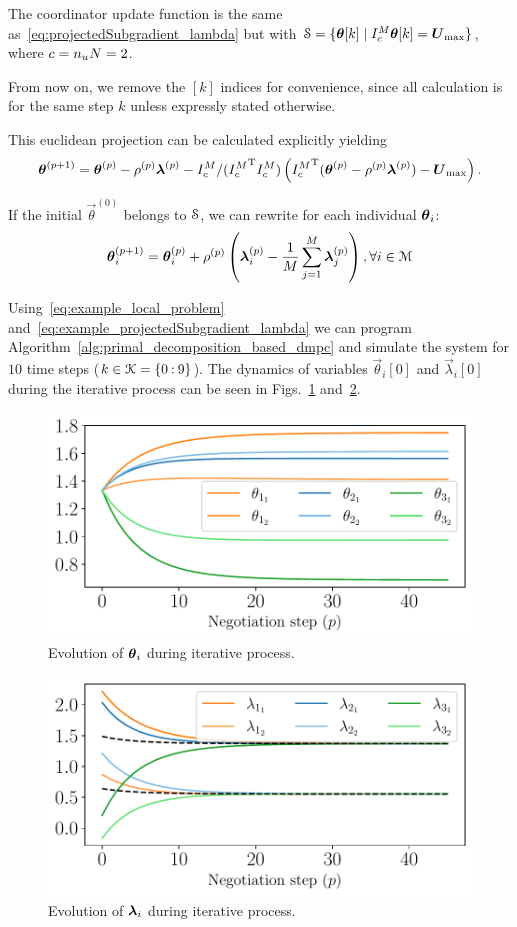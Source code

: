 \documentclass[../main.tex]{subfiles}
\begin{document}
The coordinator update function is the same as~\eqref{eq:projectedSubgradient_lambda} but with ${\mathcal{S} = \{\boldsymbol{\theta}[k]\mid I_{c}^{M}\boldsymbol{\theta}[k] = \boldsymbol{U}_{\max}\}}$, where $c=n_{u}N=2$.

From now on, we remove the $[k]$ indices for convenience, since all calculation is for the same step $k$ unless expressly stated otherwise.

This euclidean projection can be calculated explicitly yielding
\begin{equation}
    \boldsymbol{\theta}^{(p+1)}=\boldsymbol{\theta}^{(p)}-\rho^{(p)}\boldsymbol{\lambda}^{(p)}-{I_{c}^M}/({I_{c}^M}^{\mathrm{T}} {I_{c}^M})\left({I_{c}^M}^{\mathrm{T}}(\boldsymbol{\theta}^{(p)}-\rho^{(p)}\boldsymbol{\lambda}^{(p)}) -\boldsymbol{U}_{\max}\right).
\end{equation}

If the initial ${\vec{\theta}}^{(0)}$ belongs to $\mathcal{S}$, we can rewrite for each individual $\boldsymbol{\theta}_i$:
\begin{equation}
  \label{eq:example_projectedSubgradient_lambda}
 \boldsymbol{\theta}_i^{(p+1)}=\boldsymbol{\theta}_i^{(p)}+\rho^{(p)}\left(\boldsymbol{\lambda}_i^{(p)}-\frac{1}{M}\sum_{j=1}^{M}\boldsymbol{\lambda}_j^{(p)}\right),\forall i\in\mathcal{M}
\end{equation}

Using~\eqref{eq:example_local_problem} and~\eqref{eq:example_projectedSubgradient_lambda}
we can program Algorithm~\ref{alg:primal_decomposition_based_dmpc} and simulate the system for $10$ time steps (${k\in\mathcal{K}=\{0\mathbin{:}9\}}$).
The dynamics of variables $\vec{\theta}_{i}[0]$ and $\vec{\lambda}_{i}[0]$ during the iterative process can be seen in Figs.~\ref{fig:example_theta} and~\ref{fig:example_lambda}.

\begin{figure}[h]
  \centering
  \includegraphics[width=.5\textwidth]{../img/example_theta.pdf}
  \caption{Evolution of $\boldsymbol{\theta}_i$ during iterative process. }\label{fig:example_theta}
\end{figure}

\begin{figure}[h]
  \centering
  \includegraphics[width=.5\textwidth]{../img/example_lambda.pdf}
  \caption{Evolution of $\boldsymbol{\lambda}_i$ during iterative process. }\label{fig:example_lambda}
\end{figure}
\end{document}
